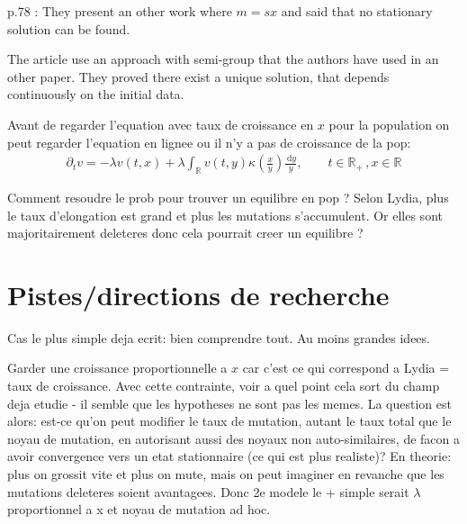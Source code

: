 \documentclass{article}
\newcommand{\p}{\partial}
\newcommand{\diff}{\,\mathrm{d}}
\newcommand{\RR}{\mathbb{R}}
\begin{document}
p.78 : They present an other work where $m = sx$ and said that no stationary solution can be found. 

The article use an approach with semi-group that the authors have used in an other paper. They proved there exist a unique solution, that depends continuously on the initial data.  

Avant de regarder l'equation avec taux de croissance en $x$ pour la population on peut regarder l'equation en lignee ou il n'y a pas de croissance de la pop:
\begin{align*}
    \p_t v =  - \lambda v(t,x)+ \lambda \int_\RR v(t,y)\kappa\left(\frac{x}{y}\right) \frac{\diff y}{y}, \qquad t \in \RR_+ \,, x \in \RR
\end{align*}

Comment resoudre le prob pour trouver un equilibre en pop ? Selon Lydia, plus le taux d'elongation est grand et plus les mutations s'accumulent. Or elles sont majoritairement deleteres donc cela pourrait creer un equilibre ?

\section{Pistes/directions de recherche}

Cas le plus simple deja ecrit: bien comprendre tout. Au moins grandes idees.

Garder une croissance proportionnelle a $x$ car c'est ce qui correspond a Lydia = taux de croissance. Avec cette contrainte, voir a quel point cela sort du champ deja etudie - il semble que les hypotheses ne sont pas les memes. La question est alors: est-ce qu'on peut modifier le taux de mutation, autant le taux total que le noyau de mutation, en autorisant aussi des noyaux non auto-similaires, de facon a avoir convergence vers un etat stationnaire (ce qui est plus realiste)? En theorie: plus on grossit vite et plus on mute, mais on peut imaginer en revanche que les mutations deleteres soient avantagees. Donc 2e modele le + simple serait $\lambda$ proportionnel a x et noyau de mutation ad hoc.
\end{document}
